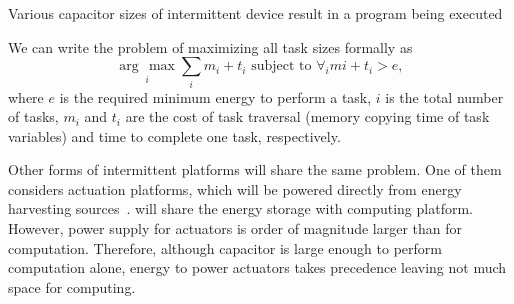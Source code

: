 Various capacitor sizes of intermittent device result in a program being executed 

We can write the problem of maximizing all task sizes formally as
%
\begin{equation}
\underset{i}{\arg\,\max} \sum_{i}m_i+t_i \text{~subject to~} \forall_i mi+t_i>e,
\end{equation}
%
where $e$ is the required minimum energy to perform a task, $i$ is the total number of tasks, $m_i$ and $t_i$ are the cost of task traversal (memory copying time of task variables) and time to complete one task, respectively.

Other forms of intermittent platforms will share the same problem. One of them considers actuation platforms, which will be powered directly from energy harvesting sources~\cite{}. will share the energy storage with computing platform. However, power supply for actuators is order of magnitude larger than for computation. Therefore, although capacitor is large enough to perform computation alone, energy to power actuators takes precedence leaving not much space for computing.


